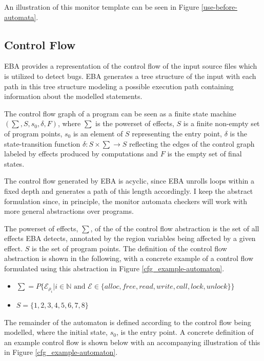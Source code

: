An illustration of this monitor template can be seen in Figure \ref{use-before-automata}. 

\subsection{Control Flow}
\label{control-flow-section}

EBA provides a representation of the control flow of the input source files which is utilized to detect bugs. EBA generates a tree structure of the input with each path in this tree structure modeling a possible execution path containing information about the modelled statements. 

\newpar The control flow graph of a program can be seen as a finite state machine $(\sum, S, s_0, \delta, F)$, where $\sum$ is the powerset of effects, $S$ is a finite non-empty set of program points, $s_0$ is an element of $S$ representing the entry point, $\delta$ is the state-transition function $\delta: S \times \sum \rightarrow S$ reflecting the edges of the control graph labeled by effects produced by computations and $F$ is the empty set of final states. 

\newpar The control flow generated by EBA is acyclic, since EBA unrolls loops within a fixed depth and generates a path of this length accordingly. I keep the abstract formulation since, in principle, the monitor automata checkers will work with more general abstractions over programs.

\newpar The powerset of effects, $\sum$, of the of the control flow abstraction is the set of all effects EBA detects, annotated by the region variables being affected by a given effect. $S$ is the set of program points. The definition of the control flow abstraction is shown in the following, with a concrete example of a control flow formulated using this abstraction in Figure \ref{cfg_example-automaton}. 

\begin{itemize}
    \item $\sum = P\{ \mathcal{E}_{\rho_i} | i \in \mathbb{N} \text{ and } \mathcal{E} \in \{ alloc, free, read, write, call, lock, unlock\}\}$
    \item $S = \{1, 2, 3, 4, 5, 6, 7, 8\}$
\end{itemize}

\noindent The remainder of the automaton is defined according to the control flow being modelled, where the initial state, $s_0$, is the entry point. A concrete definition of an example control flow is shown below with an accompanying illustration of this in Figure \ref{cfg_example-automaton}.

